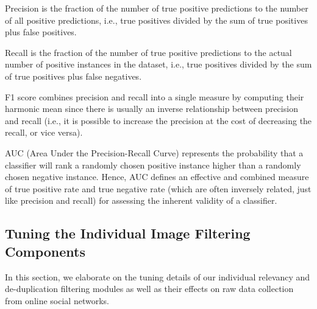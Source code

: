 \documentclass{iscram}
\begin{document}
Precision is the fraction of the number of true positive predictions to the number of all positive predictions, i.e., true positives divided by the sum of true positives plus false positives.

Recall is the fraction of the number of true positive predictions to the actual number of positive instances in the dataset, i.e., true positives divided by the sum of true positives plus false negatives.

F1 score combines precision and recall into a single measure by computing their harmonic mean since there is usually an inverse relationship between precision and recall (i.e., it is possible to increase the precision at the cost of decreasing the recall, or vice versa).

AUC (Area Under the Precision-Recall Curve) represents the probability that a classifier will rank a randomly chosen positive instance higher than a randomly chosen negative instance. Hence, AUC defines an effective and combined measure of true positive rate and true negative rate (which are often inversely related, just like precision and recall) for assessing the inherent validity of a classifier.
\fi\subsection{Tuning the Individual Image Filtering Components}

In this section, we elaborate on the tuning details of our individual relevancy and de-duplication filtering modules as well as their effects on raw data collection from online social networks.
\end{document}
